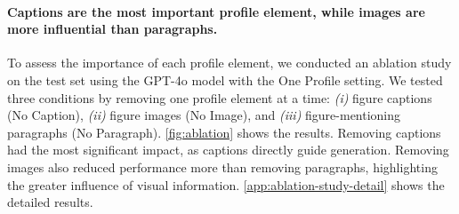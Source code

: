 

\paragraph{Captions are the most important profile element, while images are more influential than paragraphs.}
To assess the importance of each profile element, we conducted an ablation study on the test set using the GPT-4o model with the One Profile setting.
We tested three conditions by removing one profile element at a time: 
{\em (i)} figure captions (No Caption), 
{\em (ii)} figure images (No Image), and 
{\em (iii)} figure-mentioning paragraphs (No Paragraph). 
\autoref{fig:ablation} shows the results. 
Removing captions had the most significant impact, as captions directly guide generation. 
Removing images also reduced performance more than removing paragraphs, highlighting the greater influence of visual information.
\autoref{app:ablation-study-detail} shows the detailed results.

